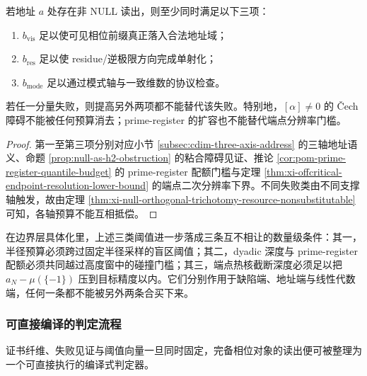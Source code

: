 \begin{proposition}[正交阈值的并行闭包]\label{prop:typed-address-biaxial-completion-readability-thresholds}
若地址 \(a\) 处存在非 \(\mathrm{NULL}\) 读出，则至少同时满足以下三项：
\begin{enumerate}
  \item \(b_{\mathrm{vis}}\) 足以使可见相位前缀真正落入合法地址域；
  \item \(b_{\mathrm{res}}\) 足以使 residue/逆极限方向完成单射化；
  \item \(b_{\mathrm{mode}}\) 足以通过模式轴与一致维数的协议检查。
\end{enumerate}
若任一分量失败，则提高另外两项都不能替代该失败。特别地，\([\alpha]\neq 0\) 的 Čech 障碍不能被任何预算消去；prime-register 的扩容也不能替代端点分辨率门槛。
\end{proposition}
\begin{proof}
第一至第三项分别对应小节 \ref{subsec:cdim-three-axis-address} 的三轴地址语义、命题 \ref{prop:null-as-h2-obstruction} 的粘合障碍见证、推论 \ref{cor:pom-prime-register-quantile-budget} 的 prime-register 配额门槛与定理 \ref{thm:xi-offcritical-endpoint-resolution-lower-bound} 的端点二次分辨率下界。不同失败类由不同支撑轴触发，故由定理 \ref{thm:xi-null-orthogonal-trichotomy-resource-nonsubstitutable} 可知，各轴预算不能互相抵偿。
\end{proof}

在边界层具体化里，上述三类阈值进一步落成三条互不相让的数量级条件：其一，半径预算必须跨过固定半径采样的盲区阈值；其二，dyadic 深度与 prime-register 配额必须共同越过高度窗中的碰撞门槛；其三，端点热核截断深度必须足以把 \(a_N-\mu(\{-1\})\) 压到目标精度以内。它们分别作用于缺陷端、地址端与线性代数端，任何一条都不能被另外两条合买下来。

\subsubsection{可直接编译的判定流程}\label{subsubsec:typed-address-biaxial-completion-compiled-reader}
证书纤维、失败见证与阈值向量一旦同时固定，完备相位对象的读出便可被整理为一个可直接执行的编译式判定器。

